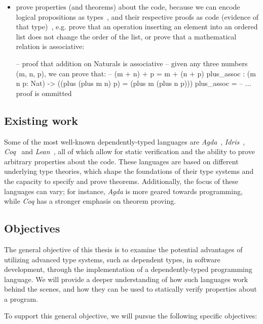 \documentclass[12pt]{article}
\theoremstyle{definition}
\begin{document}
\begin{itemize}
       \item prove properties (and theorems) about the code, because we can encode logical propositions as types~\cite{nlab:propositions-as-types}, and their respective proofs as code (evidence of that type)~\cite{nlab:proofs-as-programs}, e.g. prove that an operation inserting an element into an ordered list does not change the order of the list, or prove that a mathematical relation is associative:
       \begin{piforall}
-- proof that addition on Naturals is associative
-- given any three numbers (m, n, p), we can prove that:
-- (m + n) + p = m + (n + p)
plus_assoc : (m n p: Nat) -> ((plus (plus m n) p) = (plus m (plus n p)))
plus_assoc = -- ... proof is ommitted
       \end{piforall}

\end{itemize}

\subsection{Existing work}

Some of the most well-known dependently-typed languages are \emph{Agda}~\cite{agda}, \emph{Idris}~\cite{idris}, \emph{Coq}~\cite{coq} and \emph{Lean}~\cite{lean}, all of which allow for static verification and the ability to prove arbitrary properties about the code. These languages are based on different underlying type theories, which shape the foundations of their type systems and the capacity to specify and prove theorems. Additionally, the focus of these languages can vary; for instance, \emph{Agda} is more geared towards programming, while \emph{Coq} has a stronger emphasis on theorem proving.

\subsection{Objectives}

The general objective of this thesis is to examine the potential advantages of utilizing advanced type systems, such as dependent types, in software development, through the implementation of a dependently-typed programming language. We will provide a deeper understanding of how such languages work behind the scenes, and how they can be used to statically verify properties about a program.

To support this general objective, we will pursue the following specific objectives:
\end{document}
